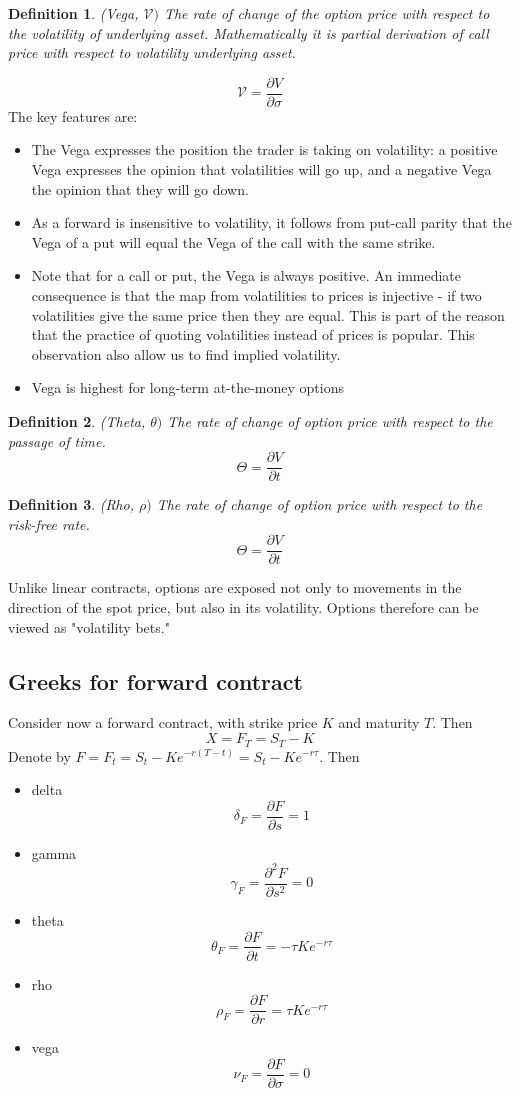 \documentclass{book}
\newtheorem{definition}{Definition}[section]
\begin{document}
\begin{definition}(Vega, $\mathcal{V})$
The rate of change of the option price with respect to the volatility of underlying asset. Mathematically it is partial derivation of call price with respect to volatility underlying asset.
\end{definition}
$$
\mathcal{V}=\frac{\partial V}{\partial \sigma}
$$
The key features are:
\begin{itemize}
\item The Vega expresses the position the trader is taking on volatility: a positive Vega expresses the opinion that volatilities will go up, and a negative Vega the opinion that they will go down.
\item As a forward is insensitive to volatility, it follows from put-call parity that the Vega of a put will equal the Vega of the call with the same strike.
\item Note that for a call or put, the Vega is always positive. An immediate consequence is that the map from volatilities to prices is injective - if two volatilities give the same price then they are equal. This is part of the reason that the practice of quoting volatilities instead of prices is popular. This observation also allow us to find implied volatility. 
\item Vega is highest for long-term at-the-money options
\end{itemize}
\begin{definition}(Theta,  $\theta)$
The rate of change of option price with respect to the passage of time.
$$
\Theta=\frac{\partial V}{\partial t}
$$
\end{definition}
\begin{definition}(Rho,  $\rho)$
The rate of change of option price with respect to the risk-free rate.
$$
\Theta=\frac{\partial V}{\partial t}
$$
\end{definition}



Unlike linear contracts, options are exposed not only to movements in the direction of the spot price, but also in its volatility. Options therefore can be viewed as "volatility bets."



\subsection{Greeks for forward contract}
Consider now a forward contract, with strike price $K$ and maturity $T$. Then 
$$
X=F_{T}=S_{T}-K
$$
Denote by $F=F_{t}=S_{t}-Ke^{-r(T-t)}=S_{t}-Ke^{-r\tau}.$ Then
\begin{itemize}
\item delta 
$$
\delta_{F}=\frac{\partial F}{\partial s}=1
$$
\item gamma
$$
\gamma_{F}=\frac{\partial^{2}F}{\partial s^{2}}=0
$$
\item theta
$$
\theta_{F}=\frac{\partial F}{\partial t}=-\tau K e^{-r\tau}
$$
\item rho
$$
\rho_{F}=\frac{\partial F}{\partial r}=\tau K e^{-r\tau}
$$
\item vega
$$
\nu_{F}=\frac{\partial F}{\partial \sigma}=0
$$
\end{itemize}
\end{document}
